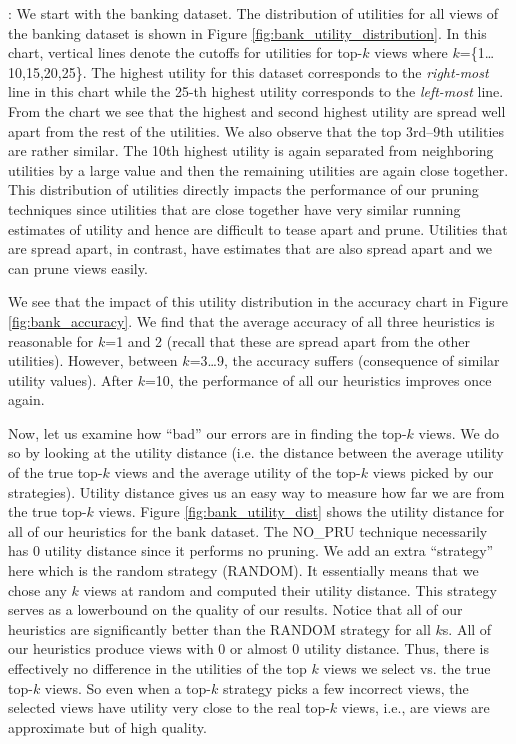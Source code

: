 :
We start with the banking dataset.
The distribution of utilities for all views of the banking dataset is
shown in Figure \ref{fig:bank_utility_distribution}. 
In this chart, vertical lines denote the cutoffs for utilities for top-$k$ views
where $k$=\{1\ldots10,15,20,25\}.
The highest utility for this dataset corresponds to the {\it right-most} line
in this chart while the 25-th highest utility corresponds to the {\it left-most}
line.
From the chart we see that the
highest and second highest utility are spread well apart from the rest of the
utilities.
We also observe that the top 3rd--9th utilities are rather similar. 
The 10th highest utility is again separated from neighboring utilities by a
large value and then the remaining utilities are again close together.
This distribution of utilities directly impacts the performance of our pruning
techniques since utilities that are close together have very similar running
estimates of utility and hence are difficult to tease apart and prune.
Utilities that are spread apart, in contrast, have estimates that are also
spread apart and we can prune views easily.

We see that the impact of this utility distribution in the accuracy chart in
Figure \ref{fig:bank_accuracy}.
We find that the average accuracy of all three heuristics is reasonable for
$k$=1 and 2 (recall that these are spread apart from the other utilities).
However, between $k$=3\ldots9, the accuracy suffers (consequence of similar
utility values).
After $k$=10, the performance of all our heuristics improves once again.

Now, let us examine how ``bad'' our errors are in finding the top-$k$ views.
We do so by looking at the utility distance (i.e. the distance between
the average utility of the true top-$k$ views and the average utility of the
top-$k$ views picked by our strategies).
Utility distance gives us an easy way to measure how far we are from the true
top-$k$ views.
Figure \ref{fig:bank_utility_dist} shows the utility distance for
all of our heuristics for the bank dataset.
The NO\_PRU technique necessarily has 0 utility distance since
it performs no pruning.
We add an extra ``strategy'' here which is the random strategy (RANDOM).
It essentially means that we chose any $k$ views at random and computed their
utility distance.
This strategy serves as a lowerbound on the quality of our results.
Notice that all of our heuristics are significantly better than the RANDOM
strategy for all $k$s.
All of our heuristics produce views with 0 or almost 0 utility distance. 
Thus, there is effectively no difference in the utilities of the top $k$ views
we select vs. the true top-$k$ views.
So even when a top-$k$ strategy picks a few incorrect views, the selected views
have utility very close to the real top-$k$ views, i.e., are views are
approximate but of high quality.

